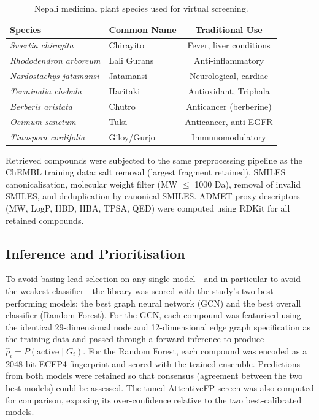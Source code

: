 \begin{table}[H]
\centering
\caption{Nepali medicinal plant species used for virtual screening.}
\label{tab:plants}
\begin{tabular}{llc}
\toprule
\textbf{Species} & \textbf{Common Name} & \textbf{Traditional Use} \\
\midrule
\textit{Swertia chirayita}     & Chirayito       & Fever, liver conditions \\
\textit{Rhododendron arboreum} & Lali Gurans     & Anti-inflammatory        \\
\textit{Nardostachys jatamansi}& Jatamansi       & Neurological, cardiac    \\
\textit{Terminalia chebula}    & Haritaki        & Antioxidant, Triphala    \\
\textit{Berberis aristata}     & Chutro          & Anticancer (berberine)   \\
\textit{Ocimum sanctum}        & Tulsi           & Anticancer, anti-EGFR    \\
\textit{Tinospora cordifolia}  & Giloy/Gurjo     & Immunomodulatory         \\
\bottomrule
\end{tabular}
\end{table}

Retrieved compounds were subjected to the same preprocessing pipeline as the
ChEMBL training data: salt removal (largest fragment retained), SMILES
canonicalisation, molecular weight filter (MW $\leq$ 1000 Da), removal of
invalid SMILES, and deduplication by canonical SMILES. ADMET-proxy descriptors
(MW, LogP, HBD, HBA, TPSA, QED) were computed using RDKit for all retained
compounds.

\subsection{Inference and Prioritisation}

To avoid basing lead selection on any single model---and in particular to avoid the
weakest classifier---the library was scored with the study's two best-performing
models: the best graph neural network (GCN) and the best overall classifier (Random
Forest). For the GCN, each compound was featurised using the identical 29-dimensional
node and 12-dimensional edge graph specification as the training data and passed
through a forward inference to produce $\hat{p}_i = P(\text{active} \mid G_i)$. For
the Random Forest, each compound was encoded as a 2048-bit ECFP4 fingerprint and
scored with the trained ensemble. Predictions from both models were retained so that
consensus (agreement between the two best models) could be assessed. The tuned
AttentiveFP screen was also computed for comparison, exposing its over-confidence
relative to the two best-calibrated models.

